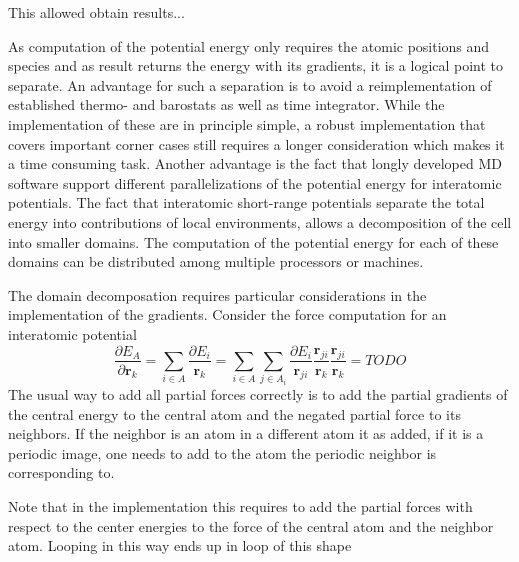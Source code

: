 This allowed obtain results...

As computation of the potential energy only requires the atomic positions and species and as result returns the energy with its gradients, it is a logical point to separate.
An advantage for such a separation is to avoid a reimplementation of established thermo- and barostats as well as time integrator.
While the implementation of these are in principle simple, a robust implementation that covers important corner cases still requires a longer consideration which makes it a time consuming task.
Another advantage is the fact that longly developed MD software support different parallelizations of the potential energy for interatomic potentials.
The fact that interatomic short-range potentials separate the total energy into contributions of local environments, allows a decomposition of the cell into smaller domains.
The computation of the potential energy for each of these domains can be distributed among multiple processors or machines.

The domain decomposation requires particular considerations in the implementation of the gradients.
Consider the force computation for an interatomic potential
\begin{equation}
  \frac{\partial E_A}{\partial\mathbf{r}_k} = \sum_{i\in A} \frac{\partial E_i}{\mathbf{r}_k} = \sum_{i\in A}\sum_{j\in A_i} \frac{\partial E_i}{\mathbf{r}_{ji}} \frac{\mathbf{r}_{ji}}{\mathbf{r}_k}
  \frac{\mathbf{r}_{ji}}{\mathbf{r}_k} =  TODO
\end{equation}
The usual way to add all partial forces correctly is to add the partial gradients of the central energy to the central atom and the negated partial force to its neighbors.
If the neighbor is an atom in a different atom it as added, if it is a periodic image, one needs to add to the atom the periodic neighbor is corresponding to.

Note that in the implementation this requires to add the partial forces with respect to the center energies to the force of the central atom and the neighbor atom.
Looping in this way ends up in loop of this shape


